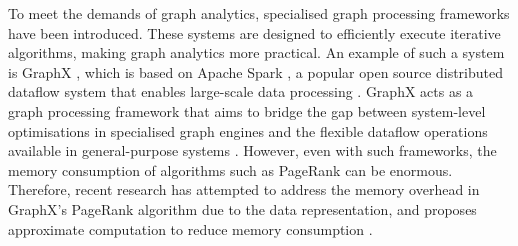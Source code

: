 To meet the demands of graph analytics, specialised graph processing frameworks have been introduced. These systems are designed to efficiently execute iterative algorithms, making graph analytics more practical. An example of such a system is GraphX \cite{xin_graphx_2013}, which is based on Apache Spark \cite{xin_graphx_2013}, a popular open source distributed dataflow system that enables large-scale data processing \cite{shanahan_large_2015}. GraphX acts as a graph processing framework that aims to bridge the gap between system-level optimisations in specialised graph engines and the flexible dataflow operations available in general-purpose systems \cite{jin_software_2022}. However, even with such frameworks, the memory consumption of algorithms such as PageRank can be enormous. Therefore, recent research has attempted to address the memory overhead in GraphX's PageRank algorithm due to the data representation, and proposes approximate computation to reduce memory consumption \cite{wu_efficient_2024}. 